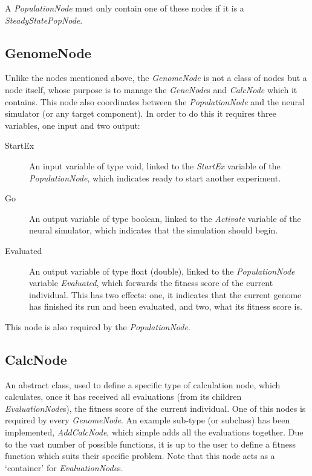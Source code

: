 \documentclass[10pt, notitlepage, a4paper]{article}
\begin{document}
A {\it PopulationNode} must only contain one of these nodes if it is a {\it SteadyStatePopNode}.

\subsection{GenomeNode}
Unlike the nodes mentioned above, the {\it GenomeNode} is not a class of nodes but a node itself, whose purpose is to manage the {\it GeneNode}s and {\it CalcNode} which it contains. This node also coordinates between the {\it PopulationNode} and the neural simulator (or any target component). In order to do this it requires three variables, one input and two output:
\begin{description}
\item[StartEx] An input variable of type void, linked to the {\it StartEx} variable of the {\it PopulationNode}, which indicates ready to start another experiment.
\item[Go] An output variable of type boolean, linked to the {\it Activate} variable of the neural simulator, which indicates that the simulation should begin.
\item[Evaluated] An output variable of type float (double), linked to the {\it PopulationNode} variable {\it Evaluated}, which forwards the fitness score of the current individual. This has two effects: one, it indicates that the current genome has finished its run and been evaluated, and two, what its fitness score is.
\end{description}

This node is also required by the {\it PopulationNode}.

\subsection{CalcNode}
An abstract class, used to define a specific type of calculation node, which calculates, once it has received all evaluations (from its children {\it EvaluationNode}s), the fitness score of the current individual. One of this nodes is required by every {\it GenomeNode}. An example sub-type (or subclass) has been implemented, {\it AddCalcNode}, which simple adds all the evaluations together. Due to the vast number of possible functions, it is up to the user to define a fitness function which suits their specific problem. Note that this node acts as a `container' for {\it EvaluationNode}s.
\end{document}
